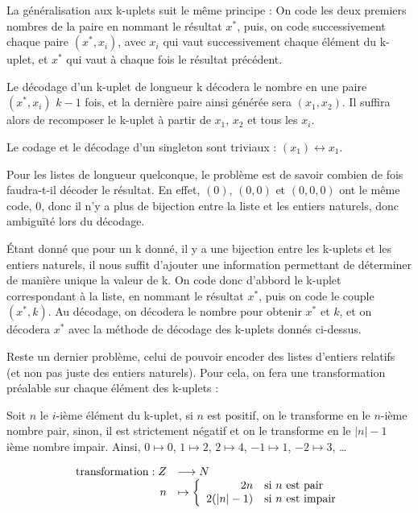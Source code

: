 \documentclass{article}
\begin{document}
La généralisation aux k-uplets suit le même principe : On code les deux premiers nombres de la paire en nommant le résultat $x^*$, puis, on
code successivement chaque paire $(x^*, x_i)$, avec $x_i$ qui vaut successivement chaque élément du k-uplet, et $x^*$ qui vaut à chaque fois
le résultat précédent.

Le décodage d'un k-uplet de longueur k décodera le nombre en une paire $(x^*, x_i)$ $k-1$ fois, et la dernière paire ainsi générée sera
$(x_1, x_2)$. Il suffira alors de recomposer le k-uplet à partir de $x_1$, $x_2$ et tous les $x_i$.

Le codage et le décodage d'un singleton sont triviaux : $(x_1) \leftrightarrow x_1$.

Pour les listes de longueur quelconque, le problème est de savoir combien de fois faudra-t-il décoder le résultat. En effet, $(0)$, $(0,0)$
et $(0,0,0)$ ont le même code, $0$, donc il n'y a plus de bijection entre la liste et les entiers naturels, donc ambiguïté lors du décodage.

Étant donné que pour un k donné, il y a une bijection entre les k-uplets et les entiers naturels, il nous suffit d'ajouter une information
permettant de déterminer de manière unique la valeur de k. On code donc d'abbord le k-uplet correspondant à la liste, en nommant le résultat
$x^*$, puis on code le couple $(x^*, k)$. Au décodage, on décodera le nombre pour obtenir $x^*$ et $k$, et on décodera $x^*$ avec la méthode
de décodage des k-uplets donnés ci-dessus.

Reste un dernier problème, celui de pouvoir encoder des listes d'entiers relatifs (et non pas juste des entiers naturels). Pour cela, on
fera une transformation préalable sur chaque élément des k-uplets :

Soit $n$ le $i$-ième élément du k-uplet, si $n$ est positif, on le transforme en le $n$-ième nombre pair, sinon, il est strictement négatif et on le transforme en le $|n|-1$ ième nombre impair. Ainsi, $0 \mapsto 0$, $1 \mapsto 2$, $2 \mapsto 4$, $-1 \mapsto 1$, $-2 \mapsto 3$, \dots

\begin{equation}
  \begin{array}{r l}
    \mathrm{transformation} : Z & \longrightarrow N \\
    n & \mapsto
    \left \{
      \begin{array}{r l}
        2n       & \text{si $n$ est pair} \\
        2(|n|-1) & \text{si $n$ est impair}
      \end{array}
    \right .
  \end{array}
\end{equation}
\end{document}
